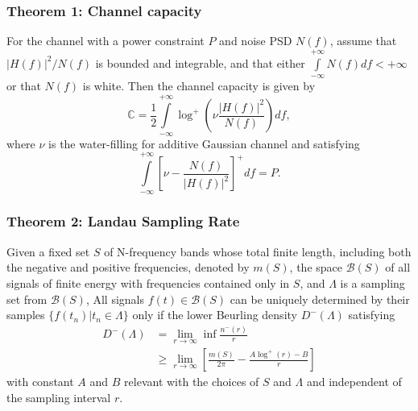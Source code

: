 \documentclass{beamer}
\begin{document}
\begin{frame}
\frametitle{Theorem 1: Channel capacity}
\begin{block}{}
  \cite[Th. 8.5.1]{Gallager:1968} For the channel with a power constraint $P$ and noise PSD $N(f)$, assume that $|H(f)|^2/N(f)$ is bounded and integrable, and that either $\int\limits_{-\infty}^{+\infty}N(f)df<+\infty$ or that $N(f)$ is white. Then the channel capacity is given by
  \begin{equation}
    \label{nyquist_rate}
    \mathbb{C}=\frac{1}{2}\int\limits_{-\infty}^{+\infty}\log^+\left( \nu\frac{|H(f)|^2}{N(f)}\right)df,
  \end{equation}
where $\nu$ is the water-filling for additive Gaussian channel and satisfying
\begin{equation}
  \int\limits_{-\infty}^{+\infty}\left[\nu-\frac{N(f)}{|H(f)|^2}\right]^+df=P.
\end{equation}
\end{block}
\end{frame}

\begin{frame}
\frametitle{Theorem 2: Landau Sampling Rate}
\begin{block}{}
  \cite[Th. 1 and Lemma 4]{Landau:1967} Given a fixed set $S$ of N-frequency bands whose total finite length, including both the negative and positive frequencies, denoted by $m(S)$, the space $\mathscr{B}(S)$ of all signals of finite energy with frequencies contained only in $S$, and $\Lambda$ is a sampling set from $\mathscr{B}(S)$, All signals $f(t)\in\mathscr{B}(S)$ can be uniquely determined by their samples $\{f(t_n)|t_n\in\Lambda\}$ only if the lower Beurling density $D^-(\Lambda)$ satisfying
  \begin{align}
    D^-(\Lambda) &= \lim_{r\to\infty}\inf\frac{n^-(r)}{r} \nonumber \\
    & \geq \lim_{r\to\infty}\left[\frac{m(S)}{2\pi}-\frac{A\log^+(r)-B}{r}\right]
   \end{align}
with constant $A$ and $B$ relevant with the choices of $S$ and $\Lambda$ and independent of the sampling interval $r$.
\end{block}
\end{frame}
\end{document}
